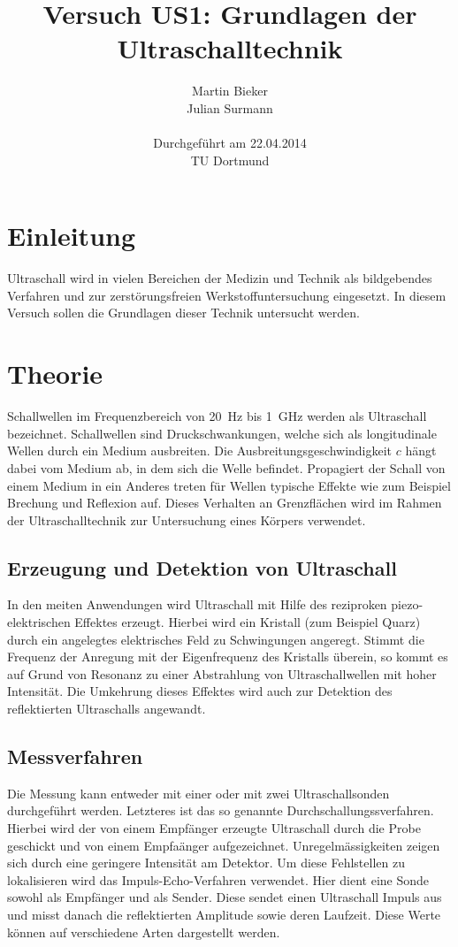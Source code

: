 \documentclass[11pt,ngerman,a4paper]{article}
\title{\textbf{Versuch US1: Grundlagen der Ultraschalltechnik}}
\author{Martin Bieker\\
		Julian Surmann\\
		\\
		Durchgef\"{u}hrt am 22.04.2014\\
		TU Dortmund}
\date{}
\begin{document}
\renewcommand\tablename{Tabelle}
\renewcommand\figurename{Abbildung}
\maketitle
\thispagestyle{empty}
\newpage
\clearpage
\setcounter{page}{1}


\section{Einleitung}
Ultraschall wird in vielen Bereichen der Medizin und Technik als bildgebendes Verfahren und zur zerst\"orungsfreien Werkstoffuntersuchung eingesetzt. In diesem Versuch sollen die Grundlagen dieser Technik untersucht werden.
\section{Theorie}

Schallwellen im Frequenzbereich von \SI{20}{\hertz} bis \SI{1}{\giga\hertz} werden als Ultraschall bezeichnet. Schallwellen sind Druckschwankungen, welche sich als longitudinale Wellen durch ein Medium ausbreiten. Die Ausbreitungsgeschwindigkeit $c$ h\"angt dabei vom Medium ab, in dem sich die Welle befindet. Propagiert der Schall von einem Medium in ein Anderes treten f\"ur Wellen typische Effekte wie zum Beispiel Brechung und Reflexion auf. Dieses Verhalten an Grenzfl\"achen wird im Rahmen der Ultraschalltechnik zur Untersuchung eines K\"orpers verwendet. 
\subsection{Erzeugung und Detektion von Ultraschall}
In den meiten Anwendungen wird Ultraschall mit Hilfe des reziproken piezo-elektrischen Effektes erzeugt. Hierbei wird ein Kristall (zum Beispiel Quarz) durch ein angelegtes elektrisches Feld zu Schwingungen angeregt. Stimmt die Frequenz der Anregung mit der Eigenfrequenz des Kristalls \"uberein, so kommt es auf Grund von Resonanz zu einer Abstrahlung von Ultraschallwellen mit hoher Intensit\"at.  Die Umkehrung dieses Effektes wird auch zur Detektion des reflektierten Ultraschalls angewandt.
\subsection{Messverfahren} 
Die Messung kann entweder mit einer oder mit zwei Ultraschallsonden durchgef\"uhrt werden. Letzteres ist das so genannte Durchschallungssverfahren. Hierbei wird der von einem Empf\"anger erzeugte Ultraschall durch die Probe geschickt und von einem Empfa\"anger aufgezeichnet. Unregelm\"assigkeiten zeigen sich durch eine geringere Intensit\"at am Detektor. Um diese Fehlstellen zu lokalisieren wird das Impuls-Echo-Verfahren verwendet. Hier dient eine Sonde sowohl als Empf\"anger und als Sender. Diese sendet einen Ultraschall Impuls aus und misst danach die reflektierten Amplitude sowie deren Laufzeit. Diese Werte k\"onnen auf verschiedene Arten dargestellt werden.
\end{document}
